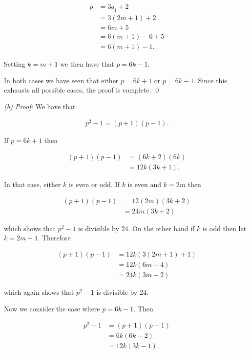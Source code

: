 \documentclass[12pt]{article}
\begin{document}
{\begin{enumerate}
  \begin{align*}
    p&=3q_1+2 \\
    &= 3(2m+1)+2 \\
    &= 6m+5 \\
    &= 6(m+1)-6+5 \\
    &= 6(m+1)-1.
  \end{align*}

  Setting $k=m+1$ we then have that $p=6k-1$.

  In both cases we have seen that either $p=6k+1$ or $p=6k-1$.  Since this exhausts all possible cases, the proof is complete.  \qed

  {\it (b) Proof:} We have that

  \begin{align*}
    p^2-1 = (p+1)(p-1).
  \end{align*}

  If $p=6k+1$ then

  \begin{align*}
    (p+1)(p-1) &= (6k+2)(6k) \\
    &= 12k(3k+1).
  \end{align*}

  In that case, either $k$ is even or odd.  If $k$ is even and $k=2m$ then

  \begin{align*}
    (p+1)(p-1) &= 12(2m)(3k+2) \\
    &=24m(3k+2)
  \end{align*}

  which shows that $p^2-1$ is divisible by 24.  On the other hand if $k$ is odd then let $k=2m+1$.  Therefore

  \begin{align*}
    (p+1)(p-1) &= 12k(3(2m+1)+1)\\
    &= 12k(6m+4) \\
    &= 24k(3m+2)
  \end{align*}

  which again shows that $p^2-1$ is divisible by 24.

  \vspace{1cm}

  Now we consider the case where $p=6k-1$.  Then

  \begin{align*}
    p^2-1 &= (p+1)(p-1) \\
    &= 6k(6k-2) \\
    &= 12k(3k-1).
  \end{align*}


\end{enumerate}}
\end{document}

